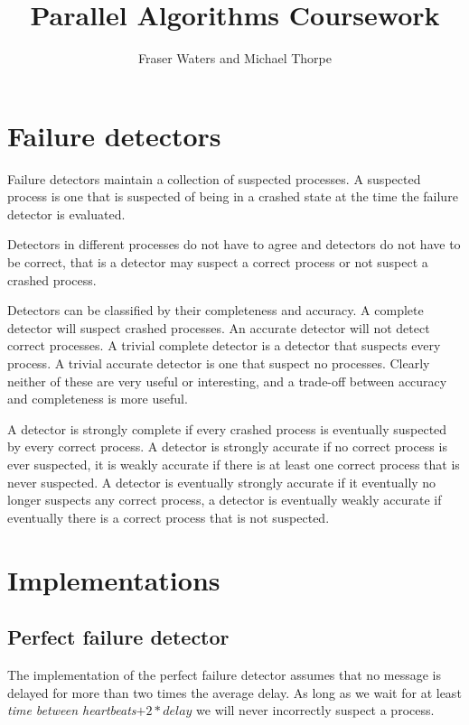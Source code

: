 \documentclass[11pt]{amsart}
\title{Parallel Algorithms Coursework}
\author{Fraser Waters and Michael Thorpe}
\begin{document}
\maketitle

\section{Failure detectors}

Failure detectors maintain a collection of suspected processes. A suspected
process is one that is suspected of being in a crashed state at the time the
failure detector is evaluated.

Detectors in different processes do not have to agree and detectors do not have
to be correct, that is a detector may suspect a correct process or not suspect
a crashed process.

Detectors can be classified by their completeness and accuracy. A complete
detector will suspect crashed processes.  An accurate detector will not detect
correct processes. A trivial complete detector is a detector that suspects
every process. A trivial accurate detector is one that suspect no processes.
Clearly neither of these are very useful or interesting, and a trade-off
between accuracy and completeness is more useful.

A detector is strongly complete if every crashed process is eventually
suspected by every correct process. A detector is strongly accurate if no
correct process is ever suspected, it is weakly accurate if there is at least
one correct process that is never suspected. A detector is eventually strongly
accurate if it eventually no longer suspects any correct process, a detector is
eventually weakly accurate if eventually there is a correct process that is not
suspected. 

\section{Implementations}

\subsection{Perfect failure detector}

The implementation of the perfect failure detector assumes that no message is
delayed for more than two times the average delay. As long as we wait for at
least \emph{time between heartbeats}$ + 2 * delay$ we will never incorrectly
suspect a process. 
\end{document}
